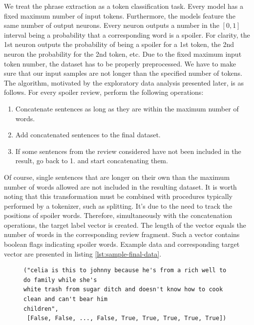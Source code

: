 \documentclass[11pt]{article}
\begin{document}
We treat the phrase extraction as a token classification task. Every model has a fixed maximum number of input tokens. Furthermore, the models feature the same number of output neurons. Every neuron outputs a number in the $[0, 1]$ interval being a probability that a corresponding word is a spoiler. For clarity, the 1st neuron outputs the probability of being a spoiler for a 1st token, the 2nd neuron the probability for the 2nd token, etc. Due to the fixed maximum input token number, the dataset has to be properly preprocessed. We have to make sure that our input samples are not longer than the specified number of tokens. The algorithm, motivated by the exploratory data analysis presented later, is as follows. For every spoiler review, perform the following operations:
\begin{enumerate}
\item Concatenate sentences as long as they are within the maximum number of words.
\item Add concatenated sentences to the final dataset.
\item If some sentences from the review considered have not been included in the result, go back to 1. and start concatenating them.
\end{enumerate}
Of course, single sentences that are longer on their own than the maximum number of words allowed are not included in the resulting dataset. It is worth noting that this transformation must be combined with procedures typically performed by a tokenizer, such as splitting. It's due to the need to track the positions of spoiler words. Therefore, simultaneously with the concatenation operations, the target label vector is created. The length of the vector equals the number of words in the corresponding review fragment. Such a vector contains boolean flags indicating spoiler words. Example data and corresponding target vector are presented in listing \ref{lst:sample-final-data}.

\begin{figure}[t]
\begin{lstlisting}[basicstyle=\small,caption={Sample element of the dataset adjusted to our needs. The maximum number of tokens in this case was 64. Note that the text has already undergone preprocessing, e.g., punctuation removal. The target vector is a boolean vector indicating spoiler words. In this case, \textit{and can't bear him children} was annotated as a spoiler phrase.},label={lst:sample-final-data}]
("celia is this to johnny because he's from a rich well to do family while she's
white trash from sugar ditch and doesn't know how to cook clean and can't bear him
children",
 [False, False, ..., False, True, True, True, True, True])
\end{lstlisting}
\end{figure}
\end{document}
